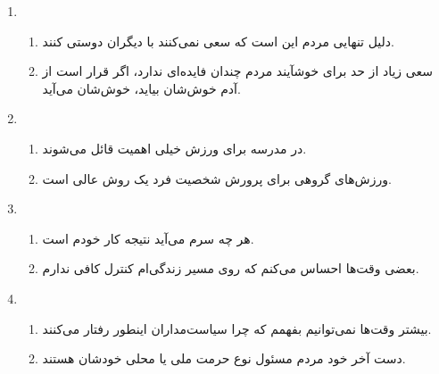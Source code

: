 \documentclass[a4paper,10pt]{article}
\begin{document}
\begin{enumerate}
\hdashline

 \item \begin{enumerate}
        \item دلیل تنهایی مردم این است که سعی نمی‌کنند با دیگران دوستی کنند.
	\item سعی زیاد از حد برای خوشآیند مردم چندان فایده‌ای ندارد، اگر قرار است از آدم خوش‌شان بیاید، خوش‌شان می‌آید.
       \end{enumerate}

\hdashline

 \item \begin{enumerate}
        \item در مدرسه برای ورزش خیلی اهمیت قائل می‌شوند.
	\item ورزش‌های گروهی برای پرورش شخصیت فرد یک روش عالی است.
       \end{enumerate}

\hdashline

 \item \begin{enumerate}
        \item هر چه سرم می‌آید نتیجه کار خودم است.
	\item بعضی وقت‌ها احساس می‌کنم که روی مسیر زندگی‌ام کنترل کافی ندارم.
       \end{enumerate}

\hdashline

 \item \begin{enumerate}
        \item بیشتر وقت‌ها نمی‌توانیم بفهمم که چرا سیاست‌مداران اینطور رفتار می‌کنند.
	\item دست آخر خود مردم مسئول نوع حرمت ملی یا محلی خودشان هستند.
       \end{enumerate}


\end{enumerate}
\end{document}
